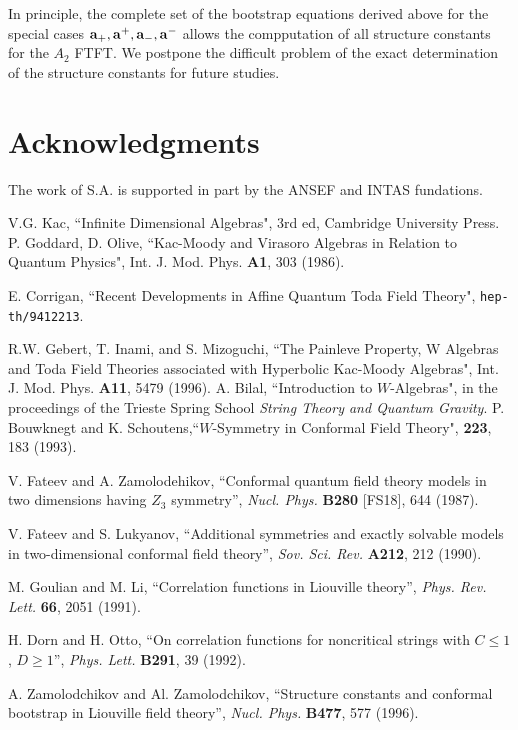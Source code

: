 \documentclass[a4paper,12pt]{article}
\begin{document}
In principle, the complete set of the bootstrap equations derived above for the
special cases ${\bf a}_+,{\bf a}^+,{\bf a}_-,{\bf a}^-$ allows
the compputation of  all structure constants for the $A_2$ FTFT.
We postpone the difficult problem of the exact determination
of the structure constants for future studies.

\section*{Acknowledgments}
The work of S.A. is supported in part by the ANSEF and INTAS
fundations.

\begin{thebibliography}{10}
%
 V.G. Kac, ``Infinite Dimensional Algebras", 3rd ed,
Cambridge University Press.
%
 P. Goddard, D. Olive, ``Kac-Moody and Virasoro Algebras in Relation
to Quantum Physics", Int. J. Mod. Phys. {\bfseries A1}, 303 (1986).

%
 E. Corrigan, ``Recent Developments in Affine Quantum Toda
Field Theory", \texttt{hep-th/9412213}.


%
 R.W. Gebert, T. Inami, and S. Mizoguchi,
``The Painleve Property, W Algebras and Toda Field Theories associated with
Hyperbolic Kac-Moody Algebras",
Int. J. Mod. Phys. {\bfseries A11}, 5479 (1996).
%
 A. Bilal, ``Introduction to $W$-Algebras",
in the proceedings of the Trieste Spring School 
\textit{String Theory and Quantum Gravity}.
%
 P. Bouwknegt and K. Schoutens,``$W$-Symmetry in Conformal
Field Theory", {\bfseries 223}, 183 (1993).

%
 V. Fateev and A. Zamolodehikov, ``Conformal quantum field
theory models in two dimensions having $Z_3$ symmetry'', {\it
Nucl. Phys.} {\bf B280} [FS18], 644 (1987).

%
 V. Fateev and S. Lukyanov, ``Additional symmetries and
exactly solvable models in two-dimensional conformal field theory'',
{\it Sov. Sci. Rev.} {\bf A212}, 212 (1990).


%
 M. Goulian and M. Li, ``Correlation functions in 
Liouville theory'', {\it Phys. Rev. Lett.} {\bf 66}, 2051 (1991).


%
 H. Dorn and H. Otto, ``On correlation functions for 
noncritical strings with $C\leq 1$, $D\geq 1$'', {\it Phys. Lett.}
{\bf B291}, 39 (1992).

%
 A. Zamolodchikov and Al. Zamolodchikov, ``Structure constants 
and conformal bootstrap in Liouville field theory'', {\it Nucl. Phys.}
{\bf B477}, 577 (1996).


\end{thebibliography}
\end{document}
